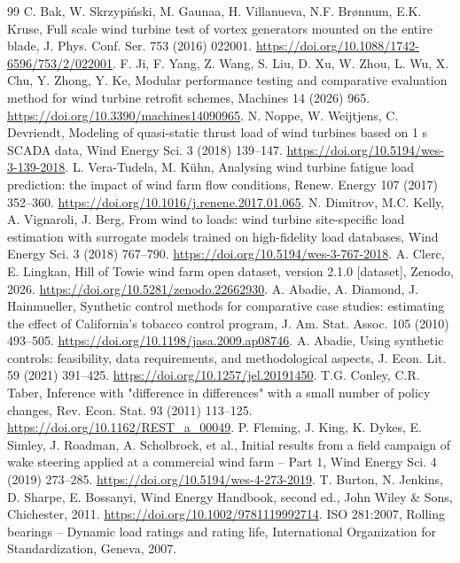 \documentclass[preprint,12pt]{elsarticle}
\begin{document}
\begin{thebibliography}{99}
 C. Bak, W. Skrzypiński, M. Gaunaa, H. Villanueva, N.F. Brønnum, E.K. Kruse, Full scale wind turbine test of vortex generators mounted on the entire blade, J. Phys. Conf. Ser. 753 (2016) 022001. \url{https://doi.org/10.1088/1742-6596/753/2/022001}.
 F. Ji, F. Yang, Z. Wang, S. Liu, D. Xu, W. Zhou, L. Wu, X. Chu, Y. Zhong, Y. Ke, Modular performance testing and comparative evaluation method for wind turbine retrofit schemes, Machines 14 (2026) 965. \url{https://doi.org/10.3390/machines14090965}.
 N. Noppe, W. Weijtjens, C. Devriendt, Modeling of quasi-static thrust load of wind turbines based on 1 s SCADA data, Wind Energy Sci. 3 (2018) 139--147. \url{https://doi.org/10.5194/wes-3-139-2018}.
 L. Vera-Tudela, M. Kühn, Analysing wind turbine fatigue load prediction: the impact of wind farm flow conditions, Renew. Energy 107 (2017) 352--360. \url{https://doi.org/10.1016/j.renene.2017.01.065}.
 N. Dimitrov, M.C. Kelly, A. Vignaroli, J. Berg, From wind to loads: wind turbine site-specific load estimation with surrogate models trained on high-fidelity load databases, Wind Energy Sci. 3 (2018) 767--790. \url{https://doi.org/10.5194/wes-3-767-2018}.
 A. Clerc, E. Lingkan, Hill of Towie wind farm open dataset, version 2.1.0 [dataset], Zenodo, 2026. \url{https://doi.org/10.5281/zenodo.22662930}.
 A. Abadie, A. Diamond, J. Hainmueller, Synthetic control methods for comparative case studies: estimating the effect of California's tobacco control program, J. Am. Stat. Assoc. 105 (2010) 493--505. \url{https://doi.org/10.1198/jasa.2009.ap08746}.
 A. Abadie, Using synthetic controls: feasibility, data requirements, and methodological aspects, J. Econ. Lit. 59 (2021) 391--425. \url{https://doi.org/10.1257/jel.20191450}.
 T.G. Conley, C.R. Taber, Inference with "difference in differences" with a small number of policy changes, Rev. Econ. Stat. 93 (2011) 113--125. \url{https://doi.org/10.1162/REST_a_00049}.
 P. Fleming, J. King, K. Dykes, E. Simley, J. Roadman, A. Scholbrock, et al., Initial results from a field campaign of wake steering applied at a commercial wind farm -- Part 1, Wind Energy Sci. 4 (2019) 273--285. \url{https://doi.org/10.5194/wes-4-273-2019}.
 T. Burton, N. Jenkins, D. Sharpe, E. Bossanyi, Wind Energy Handbook, second ed., John Wiley \& Sons, Chichester, 2011. \url{https://doi.org/10.1002/9781119992714}.
 ISO 281:2007, Rolling bearings -- Dynamic load ratings and rating life, International Organization for Standardization, Geneva, 2007.

\end{thebibliography}
\end{document}
